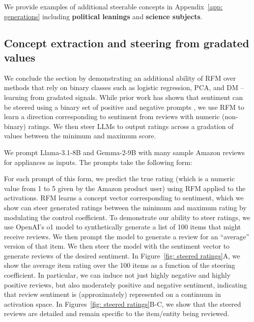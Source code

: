 \noindent We provide examples of additional steerable concepts in Appendix~\ref{app: generations} including \textbf{political leanings} and \textbf{science subjects}. 

\subsection{Concept extraction and steering from gradated values}

We conclude the section by demonstrating an additional ability of RFM over methods that rely on binary classes such as logistic regression, PCA, and DM -- learning from gradated signals. While prior work has shown that sentiment can be steered using a binary set of positive and negative prompts \citep{subramani2022extracting, turner2023activation}, we use RFM to learn a direction corresponding to sentiment from reviews with numeric (non-binary) ratings. We then steer LLMs to output ratings across a gradation of values between the minimum and maximum score. 

We prompt Llama-3.1-8B and Gemma-2-9B with many sample Amazon reviews for appliances \citep{hou2024bridging} as inputs. The prompts take the following form:
\begin{center}
\end{center}
For each prompt of this form, we predict the true rating (which is a numeric value from 1 to 5 given by the Amazon product user) using RFM applied to the activations.  RFM learns a concept vector corresponding to sentiment, which we show can steer generated ratings between the minimum and maximum rating by modulating the control coefficient. To demonstrate our ability to steer ratings, we use OpenAI's o1 model to synthetically generate a list of 100 items that might receive reviews. We then prompt the model to generate a review for an ``average'' version of that item. We then steer the model with the sentiment vector to generate reviews of the desired sentiment. In Figure~\ref{fig: steered ratings}A, we show the average item rating over the 100 items as a function of the steering coefficient. In particular, we can induce not just highly negative and highly positive reviews, but also moderately positive and negative sentiment, indicating that review sentiment is (approximately) represented on a continuum in activation space. In Figures~\ref{fig: steered ratings}B-C, we show that the steered reviews are detailed and remain specific to the item/entity being reviewed.

